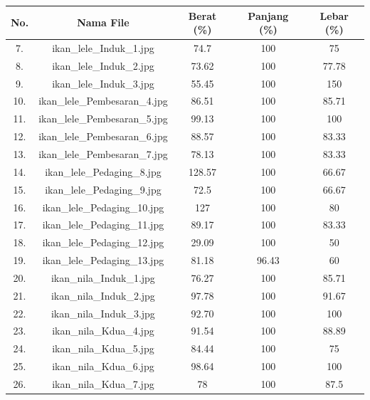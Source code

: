     \begin{table}[H]
        \centering
        \begin{tabular}{|c|c|c|c|c|}
        \hline
        No. & Nama File & Berat (\%) & Panjang (\%) & Lebar (\%) \\
        \hline
        7. & ikan\_lele\_Induk\_1.jpg & 74.7 & 100 & 75 \\
        \hline
        8. & ikan\_lele\_Induk\_2.jpg & 73.62 & 100 & 77.78 \\
        \hline
        9. & ikan\_lele\_Induk\_3.jpg & 55.45 & 100 & 150 \\
        \hline
        10. & ikan\_lele\_Pembesaran\_4.jpg & 86.51 & 100 & 85.71 \\
        \hline
        11. & ikan\_lele\_Pembesaran\_5.jpg & 99.13 & 100 & 100 \\
        \hline
        12. & ikan\_lele\_Pembesaran\_6.jpg & 88.57 & 100 & 83.33 \\
        \hline
        13. & ikan\_lele\_Pembesaran\_7.jpg & 78.13 & 100 & 83.33 \\
        \hline
        14. & ikan\_lele\_Pedaging\_8.jpg & 128.57 & 100 & 66.67 \\
        \hline
        15. & ikan\_lele\_Pedaging\_9.jpg & 72.5 & 100 & 66.67 \\
        \hline
        16. & ikan\_lele\_Pedaging\_10.jpg & 127 & 100 & 80 \\
        \hline
        17. & ikan\_lele\_Pedaging\_11.jpg & 89.17 & 100 & 83.33 \\
        \hline
        18. & ikan\_lele\_Pedaging\_12.jpg & 29.09 & 100 & 50 \\
        \hline
        19. & ikan\_lele\_Pedaging\_13.jpg & 81.18 & 96.43 & 60 \\
        \hline
        20. & ikan\_nila\_Induk\_1.jpg & 76.27 & 100 & 85.71 \\
        \hline
        21. & ikan\_nila\_Induk\_2.jpg & 97.78 & 100 & 91.67 \\
        \hline
        22. & ikan\_nila\_Induk\_3.jpg & 92.70 & 100 & 100 \\
        \hline
        23. & ikan\_nila\_Kdua\_4.jpg & 91.54 & 100 & 88.89 \\
        \hline
        24. & ikan\_nila\_Kdua\_5.jpg & 84.44 & 100 & 75 \\
        \hline
        25. & ikan\_nila\_Kdua\_6.jpg & 98.64 & 100 & 100 \\
        \hline
        26. & ikan\_nila\_Kdua\_7.jpg & 78 & 100 & 87.5 \\

\end{tabular}
\end{table}

